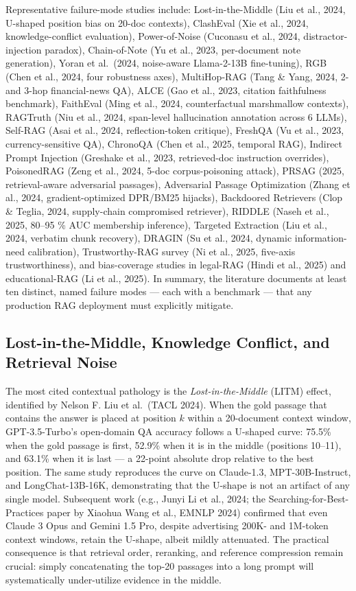 Representative failure-mode studies include: Lost-in-the-Middle (Liu et al., 2024, U-shaped position bias on 20-doc contexts), ClashEval (Xie et al., 2024, knowledge-conflict evaluation), Power-of-Noise (Cuconasu et al., 2024, distractor-injection paradox), Chain-of-Note (Yu et al., 2023, per-document note generation), Yoran et al.~(2024, noise-aware Llama-2-13B fine-tuning), RGB (Chen et al., 2024, four robustness axes), MultiHop-RAG (Tang \& Yang, 2024, 2- and 3-hop financial-news QA), ALCE (Gao et al., 2023, citation faithfulness benchmark), FaithEval (Ming et al., 2024, counterfactual marshmallow contexts), RAGTruth (Niu et al., 2024, span-level hallucination annotation across 6 LLMs), Self-RAG (Asai et al., 2024, reflection-token critique), FreshQA (Vu et al., 2023, currency-sensitive QA), ChronoQA (Chen et al., 2025, temporal RAG), Indirect Prompt Injection (Greshake et al., 2023, retrieved-doc instruction overrides), PoisonedRAG (Zeng et al., 2024, 5-doc corpus-poisoning attack), PRSAG (2025, retrieval-aware adversarial passages), Adversarial Passage Optimization (Zhang et al., 2024, gradient-optimized DPR/BM25 hijacks), Backdoored Retrievers (Clop \& Teglia, 2024, supply-chain compromised retriever), RIDDLE (Naseh et al., 2025, 80--95 \% AUC membership inference), Targeted Extraction (Liu et al., 2024, verbatim chunk recovery), DRAGIN (Su et al., 2024, dynamic information-need calibration), Trustworthy-RAG survey (Ni et al., 2025, five-axis trustworthiness), and bias-coverage studies in legal-RAG (Hindi et al., 2025) and educational-RAG (Li et al., 2025). In summary, the literature documents at least ten distinct, named failure modes --- each with a benchmark --- that any production RAG deployment must explicitly mitigate.

\subsection{Lost-in-the-Middle, Knowledge Conflict, and Retrieval Noise}\label{lost-in-the-middle-knowledge-conflict-and-retrieval-noise}

The most cited contextual pathology is the \emph{Lost-in-the-Middle} (LITM) effect, identified by Nelson F. Liu et al.~(TACL 2024). When the gold passage that contains the answer is placed at position \(k\) within a 20-document context window, GPT-3.5-Turbo's open-domain QA accuracy follows a U-shaped curve: 75.5\% when the gold passage is first, 52.9\% when it is in the middle (positions 10--11), and 63.1\% when it is last --- a 22-point absolute drop relative to the best position. The same study reproduces the curve on Claude-1.3, MPT-30B-Instruct, and LongChat-13B-16K, demonstrating that the U-shape is not an artifact of any single model. Subsequent work (e.g., Junyi Li et al., 2024; the Searching-for-Best-Practices paper by Xiaohua Wang et al., EMNLP 2024) confirmed that even Claude 3 Opus and Gemini 1.5 Pro, despite advertising 200K- and 1M-token context windows, retain the U-shape, albeit mildly attenuated. The practical consequence is that retrieval order, reranking, and reference compression remain crucial: simply concatenating the top-20 passages into a long prompt will systematically under-utilize evidence in the middle.

